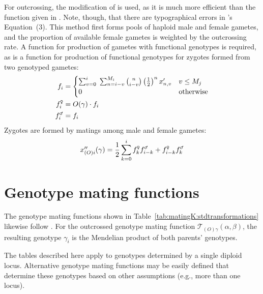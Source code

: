 \documentclass[10pt,twoside,a4paper,fleqn]{report}
\numberwithin{equation}{section}  %
\newcommand{\gami}{\mbox{$f_{i}$}}
\newcommand{\gammalei}{\mbox{$f_{i}^{\text{\Male}}$}}
\newcommand{\gamfemalei}{\mbox{$f_{i}^{\text{\Female}}$}}
\newcommand{\gammalek}{\mbox{$f_{k}^{\text{\Male}}$}}
\newcommand{\gamfemalek}{\mbox{$f_{k}^{\text{\Female}}$}}
\newcommand{\gammaleik}{\mbox{$f_{i-k}^{\text{\Male}}$}}
\newcommand{\gamfemaleik}{\mbox{$f_{i-k}^{\text{\Female}}$}}
\newcommand{\Mj}{\mbox{$M_{j}$}}
\newcommand{\xpnv}{\mbox{$x'_{n,v}$}}
\newcommand{\xppoig}{\mbox{$x''_{(O)i}(\gamma)$}}
\newcommand{\Og}{\mbox{$O(\gamma)$}}
\newcommand{\TOgab}{\mbox{$\mathcal{T}_{(O)\gamma}(\alpha, \beta)$}}
\begin{document}
{For outcrossing, the modification of \citet{Charlesworth:1990:5337} is used, as it is much more efficient than the function given in \citet{Kondrashov:1985:5375}.  Note, though, that there are typographical errors in \citeauthor{Charlesworth:1990:5337}'s Equation~(3).  This method first forms pools of haploid male and female gametes, and the proportion of available female gametes is weighted by the outcrossing rate.  A function for production of gametes with functional genotypes is required, as is a function for production of functional genotypes for zygotes formed from two genotyped gametes:
\begin{align}
\label{eq:Kreproduction:gametes}
\gami    &= \begin{cases}
              \sum_{v=0}^{i}{
                \;  \sum_{n=i-v}^{M_i}{
                \binom{n}{i-v} \left(\frac{1}{2}\right)^{n} \xpnv
              }} & v \le \Mj \\
              0 & \text{otherwise}
            \end{cases} \\
\gamfemalei &= \Og \cdot \gami \\
\gammalei &= \gami
\end{align}
Zygotes are formed by matings among male and female gametes:
\begin{equation}
\label{eq:Kreproduction:zygotes}
\xppoig = \frac{1}{2} \sum_{k=0}^{i}{\gamfemalek\gammaleik+\gamfemaleik\gammalek}
\end{equation}

\section{Genotype mating functions}

The genotype mating functions shown in Table~\ref{tab:matingK:stdtransformations} likewise follow \citet{Kondrashov:1985:5375}.  For the outcrossed genotype mating function \TOgab, the resulting genotype $\gamma_i$ is the Mendelian product of both parents' genotypes.

The tables described here apply to genotypes determined by a single diploid locus.  Alternative genotype mating functions may be easily defined that determine these genotypes based on other assumptions (e.g., more than one locus).

}
\end{document}
